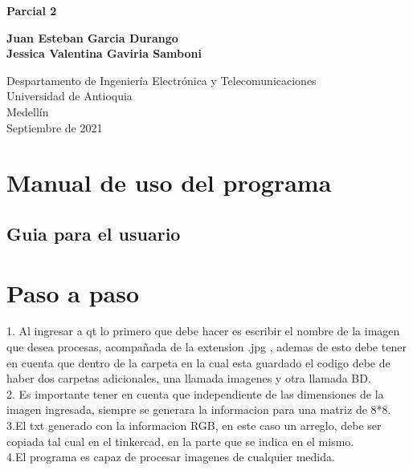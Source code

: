 \documentclass{article}
\begin{document}
\begin{titlepage}
    \begin{center}
        \vspace*{1cm}
            
        \Huge
        \textbf{Parcial 2}
            
        \vspace{0.5cm}
        \LARGE
        
            
        \vspace{1.5cm}
            
        \textbf{Juan Esteban Garcia Durango\\
            Jessica Valentina Gaviria Samboni }
        \vfill
            
        \vspace{0.8cm}
            
        \Large
        Despartamento de Ingeniería Electrónica y Telecomunicaciones\\
        Universidad de Antioquia\\
        Medellín\\
        Septiembre de 2021
            
    \end{center}
\end{titlepage}

\tableofcontents
\newpage
\section{Manual de uso del programa}\label{intro}
\subsection{Guia para el usuario}


   
\section{Paso a paso} \label{Descripción}
1. Al ingresar a qt lo primero que debe hacer es escribir el nombre de la imagen que desea procesas, acompañada de la extension .jpg , ademas de esto debe tener en cuenta que dentro de la carpeta en la cual esta guardado el codigo debe de haber dos carpetas adicionales, una llamada imagenes y otra llamada BD.\\

2. Es importante tener en cuenta que independiente de las dimensiones de la imagen ingresada, siempre se generara la informacion para una matriz de 8*8.\\

3.El txt generado con la informacion RGB, en este caso un arreglo, debe ser copiada tal cual en el tinkercad, en la parte que se indica en el mismo.\\

4.El programa es capaz de procesar imagenes de cualquier medida.





\end{document}
